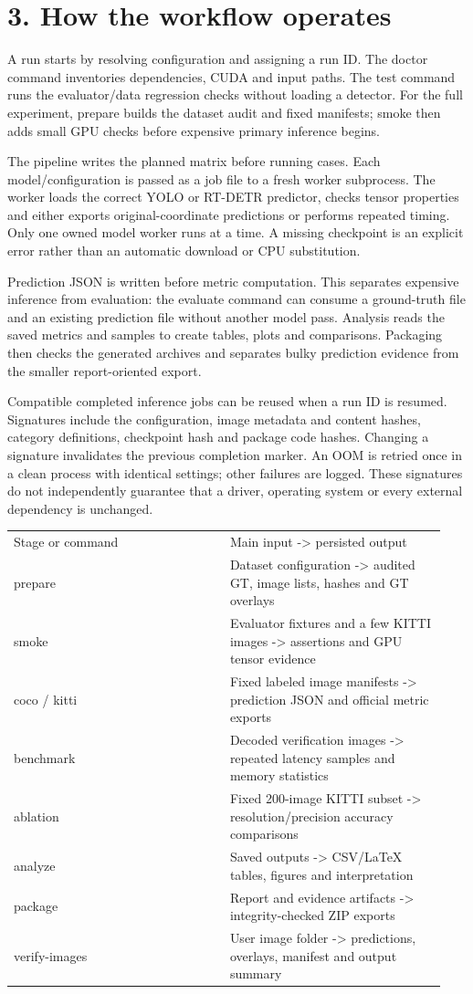 \documentclass[10pt]{article}
\begin{document}
\section*{3. How the workflow operates}
A run starts by resolving configuration and assigning a run ID. The doctor command inventories dependencies, CUDA and input paths. The test command runs the evaluator/data regression checks without loading a detector. For the full experiment, prepare builds the dataset audit and fixed manifests; smoke then adds small GPU checks before expensive primary inference begins.


The pipeline writes the planned matrix before running cases. Each model/configuration is passed as a job file to a fresh worker subprocess. The worker loads the correct YOLO or RT-DETR predictor, checks tensor properties and either exports original-coordinate predictions or performs repeated timing. Only one owned model worker runs at a time. A missing checkpoint is an explicit error rather than an automatic download or CPU substitution.


Prediction JSON is written before metric computation. This separates expensive inference from evaluation: the evaluate command can consume a ground-truth file and an existing prediction file without another model pass. Analysis reads the saved metrics and samples to create tables, plots and comparisons. Packaging then checks the generated archives and separates bulky prediction evidence from the smaller report-oriented export.


Compatible completed inference jobs can be reused when a run ID is resumed. Signatures include the configuration, image metadata and content hashes, category definitions, checkpoint hash and package code hashes. Changing a signature invalidates the previous completion marker. An OOM is retried once in a clean process with identical settings; other failures are logged. These signatures do not independently guarantee that a driver, operating system or every external dependency is unchanged.


\begin{longtable}{p{0.470\linewidth}p{0.470\linewidth}}
Stage or command & Main input -> persisted output \\
prepare & Dataset configuration -> audited GT, image lists, hashes and GT overlays \\
smoke & Evaluator fixtures and a few KITTI images -> assertions and GPU tensor evidence \\
coco / kitti & Fixed labeled image manifests -> prediction JSON and official metric exports \\
benchmark & Decoded verification images -> repeated latency samples and memory statistics \\
ablation & Fixed 200-image KITTI subset -> resolution/precision accuracy comparisons \\
analyze & Saved outputs -> CSV/LaTeX tables, figures and interpretation \\
package & Report and evidence artifacts -> integrity-checked ZIP exports \\
verify-images & User image folder -> predictions, overlays, manifest and output summary \\
\end{longtable}
\clearpage
\end{document}
